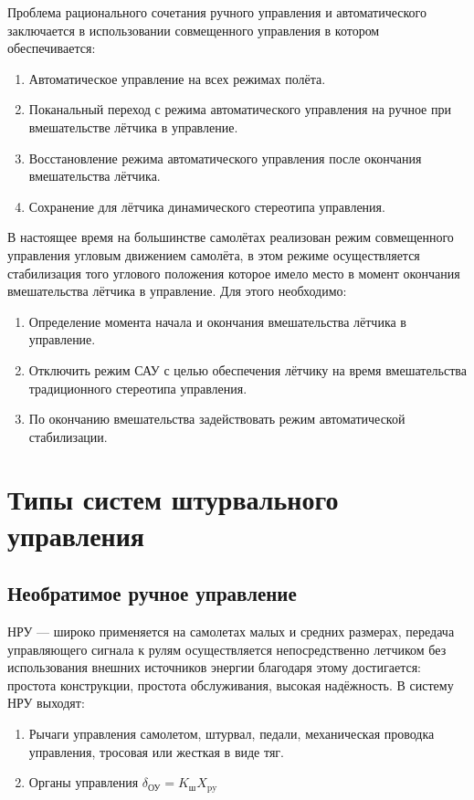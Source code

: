 \documentclass{article}
\begin{document}
Проблема рационального сочетания ручного управления и автоматического
заключается в использовании совмещенного управления в котором обеспечивается:
\begin{enumerate}
	\item Автоматическое управление на всех режимах полёта.
	\item Поканальный переход с режима автоматического управления на ручное при
	      вмешательстве лётчика в управление.
	\item Восстановление режима автоматического управления после окончания
	      вмешательства лётчика.
	\item Сохранение для лётчика динамического стереотипа управления.
\end{enumerate}
В настоящее время на большинстве самолётах реализован режим совмещенного
управления угловым движением самолёта, в этом режиме осуществляется
стабилизация того углового положения которое имело место в момент окончания
вмешательства лётчика в управление.
Для этого необходимо:
\begin{enumerate}
	\item Определение момента начала и окончания вмешательства лётчика в
	      управление.
	\item Отключить режим САУ с целью обеспечения лётчику на время
	      вмешательства традиционного стереотипа управления.
	\item По окончанию вмешательства задействовать режим автоматической
	      стабилизации.
\end{enumerate}
\newpage

\section{Типы систем штурвального управления}
\subsection{Необратимое ручное управление}
НРУ --- широко применяется на самолетах малых и средних размерах, передача
управляющего сигнала к рулям осуществляется непосредственно летчиком без
использования внешних источников энергии благодаря этому достигается: простота
конструкции, простота обслуживания, высокая надёжность.
В систему НРУ выходят:
\begin{enumerate}
	\item Рычаги управления самолетом, штурвал, педали, механическая проводка
	      управления, тросовая или жесткая в виде тяг.
	\item Органы управления $\delta_\text{ОУ} = K_\text{ш} X_\text{py}$
\end{enumerate}
\end{document}
